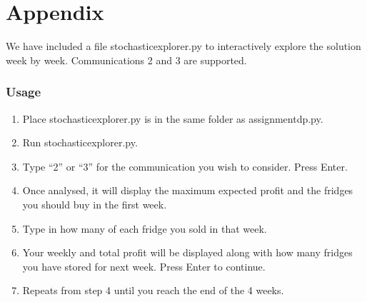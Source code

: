 \documentclass[11pt,a4paper]{article}
\begin{document}
\part{Appendix}
We have included a file stochastic{\textunderscore}explorer.py to interactively 
explore the solution week by week. Communications 2 and 3 are supported.

\section{Usage}
\begin{enumerate}
    \item Place stochastic{\textunderscore}explorer.py is in the same folder as assignment{\textunderscore}dp.py.
    \item Run stochastic{\textunderscore}explorer.py.
    \item Type ``2'' or ``3'' for the communication you wish to consider. Press Enter.
    \item Once analysed, it will display the maximum expected profit and the fridges you should buy in the first week.
    \item Type in how many of each fridge you sold in that week.
    \item Your weekly and total profit will be displayed along with how many fridges you have stored for next week. Press Enter to continue. 
    \item Repeats from step 4 until you reach the end of the 4 weeks.
\end{enumerate}
\end{document}
